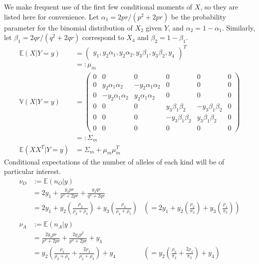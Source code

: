 \documentclass[11pt, oneside]{article}   	%
\newcommand{\bV}{\mathbb{V}}
\newcommand{\bE}{\mathbb{E}}
\begin{document}
\begin{appendices}
    We make frequent use of the first few conditional moments of $X$, so they are listed here for convenience. Let $\alpha_1 = 2pr / (p^2 + 2pr)$ be the probability parameter for the binomial distribution of $X_2$ given $Y$, and $\alpha_2 = 1 - \alpha_1$. Similarly, let $\beta_1 = 2qr / (q^2 + 2qr)$ correspond to $X_4$ and $\beta_2 = 1 - \beta_1$.
    \begin{align}
        \bE(X | Y=y) &= \begin{pmatrix}
            y_1,  y_2 \alpha_1,  y_2 \alpha_2,  y_3 \beta_1,  y_3 \beta_2,  y_4
        \end{pmatrix}^T\\
        &=: \mu_m\\
        \bV(X | Y=y) &= \begin{pmatrix}
            0 & 0 & 0 & 0 & 0 & 0\\
            0 & y_2 \alpha_1 \alpha_2 & - y_2 \alpha_1 \alpha_2 & 0 & 0 & 0\\
            0 & - y_2 \alpha_1 \alpha_2 & y_2 \alpha_1 \alpha_2 & 0 & 0 & 0\\
            0 & 0 & 0 & y_3 \beta_1 \beta_2 & - y_3 \beta_1 \beta_2 & 0\\
            0 & 0 & 0 & -y_3 \beta_1 \beta_2 & y_3 \beta_1 \beta_2 & 0\\
            0 & 0 & 0 & 0 & 0 & 0
        \end{pmatrix}\\
        &=: \Sigma_m\\
        \bE(XX^T | Y=y) &= \Sigma_m + \mu_m \mu_m^T
    \end{align}
    Conditional expectations of the number of alleles of each kind will be of particular interest.
    \begin{align}
        \nu_O & := \bE(n_O|y)\\
         &= 2y_1 + \frac{y_2 pr}{p^2 + 2pr} + \frac{y_3 qr}{q^2 + 2qr}\\
        &= 2y_1 + y_2 \left( \frac{\rho_2}{\rho_2 + \rho_3} \right) + y_3 \left( \frac{\rho_4}{\rho_4 + \rho_5} \right) &\left( = 2y_1 +  y_2 \left( \frac{\rho_2}{\pi_2} \right) + y_3 \left( \frac{\rho_4}{\pi_3} \right) \right)\\
        \nonumber \\
        \nu_A & := \bE(n_A|y)\\
        &= \frac{2 y_2 pr}{p^2 + 2pr} + \frac{2y_2 p^2}{p^2 + 2pr} + y_4\\
        &= y_2 \left( \frac{\rho_2}{\rho_2 + \rho_3} + \frac{2\rho_3}{\rho_2 + \rho_3} \right) + y_4 &\left(= y_2 \left( \frac{\rho_2}{\pi_2} + \frac{2\rho_3}{\pi_2} \right) + y_4 \right)\\

\end{align}
\end{appendices}
\end{document}
